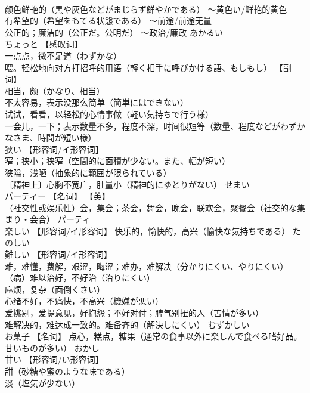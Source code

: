 \documentclass[8pt]{extreport}
\begin{document}
\begin{CJK}{UTF8}{min}
\\	颜色鲜艳的（黒や灰色などがまじらず鮮やかである） 〜黄色い/鲜艳的黄色 
\\	有希望的（希望をもてる状態である） 〜前途/前途无量 
\\	公正的；廉洁的（公正だ。公明だ） 〜政治/廉政	あかるい	
\\	ちょっと	【感叹词】 
\\	一点点，微不足道（わずかな） 
\\	喂。轻松地向对方打招呼的用语（軽く相手に呼びかける語、もしもし） 【副词】 
\\	相当，颇（かなり、相当） 
\\	不太容易，表示没那么简单（簡単にはできない） 
\\	试试，看看，以轻松的心情事做（軽い気持ちで行う様） 
\\	一会儿，一下；表示数量不多，程度不深，时间很短等（数量、程度などがわずかなさま、時間が短い様）		
\\	狭い	【形容词/イ形容词】 
\\	窄；狭小；狭窄（空間的に面積が少ない。また、幅が短い） 
\\	狭隘，浅陋（抽象的に範囲が限られている） 
\\	〔精神上〕心胸不宽广，肚量小（精神的にゆとりがない）	せまい	
\\	パーティー	【名词】 【英】
\\	（社交性或娱乐性）会，集会；茶会，舞会，晚会，联欢会，聚餐会（社交的な集まり・会合）		パーティ
\\	楽しい	【形容词/イ形容词】 快乐的，愉快的，高兴（愉快な気持ちである）	たのしい	
\\	難しい	【形容词/イ形容词】 
\\	难，难懂，费解，艰涩，晦涩；难办，难解决（分かりにくい、やりにくい） 
\\	（病）难以治好，不好治（治りにくい） 
\\	麻烦，复杂（面倒くさい） 
\\	心绪不好，不痛快，不高兴（機嫌が悪い） 
\\	爱挑剔，爱提意见，好抱怨；不好对付；脾气别扭的人（苦情が多い） 
\\	难解决的，难达成一致的。难备齐的（解決しにくい）	むずかしい	
\\	お菓子	【名词】 点心，糕点，糖果（通常の食事以外に楽しんで食べる嗜好品。甘いものが多い）	おかし	
\\	甘い	【形容词/い形容词】 
\\	甜（砂糖や蜜のような味である） 
\\	淡（塩気が少ない） 

\end{CJK}
\end{document}
